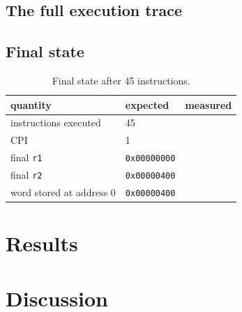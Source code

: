 \subsection*{The full execution trace}

\subsection*{Final state}

\begin{table}[htbp]
\centering
\caption{Final state after 45 instructions.}
\label{tab:lab12-final}
\begin{tabular}{lll}
\toprule
quantity & expected & measured \\
\midrule
instructions executed & 45 & \\
CPI & 1 & \\
final \texttt{r1} & \texttt{0x00000000} & \\
final \texttt{r2} & \texttt{0x00000400} & \\
word stored at address 0 & \texttt{0x00000400} & \\
\bottomrule
\end{tabular}
\end{table}


\section{Results}




\section{Discussion}
%
%
%
